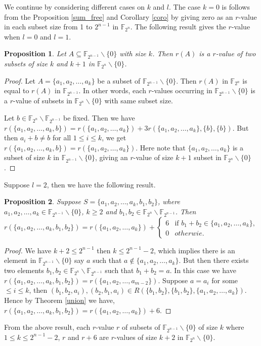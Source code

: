 \documentclass[12pt,a4paper]{article}
\newtheorem{prop}{Proposition}[section]
\begin{document}
	
	\par We continue by considering different cases on $k$ and $l$. The case $k=0$ is follows from the Proposition \ref{sum_free} and Corollary \ref{coro} by giving zero as an $r$-value in each subset size from 1 to $2^{n-1}$ in $\mathbb{F}_{2^n}$. The following result gives the $r$-value when $l=0$ and $l=1$.  
	\begin{prop}\label{l=0,1}
		Let $A\subseteq\mathbb{F}_{2^{n-1}}\backslash\{0\}$ with size $k$. Then $r(A)$ is a $r$-value of two subsets of size $k$ and $k+1$ in $\mathbb{F}_{2^{n}}\backslash\{0\}$.
	\end{prop}
	\begin{proof}
		Let $A=\{a_1,a_2,\dots,a_k\}$ be a subset of $\mathbb{F}_{2^{n-1}}\backslash\{0\}$. Then $r(A)$ in $\mathbb{F}_{2^n}$ is equal to $r(A)$ in $\mathbb{F}_{2^{n-1}}$. In other words, each $r$-values occurring in $\mathbb{F}_{2^{n-1}}\backslash\{0\}$ is a $r$-value of subsets in $\mathbb{F}_{2^n}\backslash\{0\}$ with same subset size.
		
		Let $b\in\mathbb{F}_{2^n}\backslash\mathbb{F}_{2^{n-1}}$ be fixed. Then we have $r(\{a_1,a_2,\dots,a_{k},b\})=r(\{a_1,a_2,\dots,a_{k}\})+3r(\{a_1,a_2,\dots,a_{k}\},\{b\},\{b\})$. But then $a_i+b\neq b$ for all $1\leq i\leq k$, we get $r(\{a_1,a_2,\dots,a_{k},b\})=r(\{a_1,a_2,\dots,a_{k}\})$. Here note that $\{a_1,a_2,\dots,a_{k}\}$ is a subset of size $k$ in $\mathbb{F}_{2^{n-1}}\backslash\{0\}$, giving an $r$-value of size $k+1$ subset in $\mathbb{F}_{2^n}\backslash\{0\}$.
	\end{proof}
	\par Suppose $l=2$, then we have the following result. 
	\begin{prop}\label{l=2}
		Suppose $S=\{a_1,a_2,\dots,a_k,b_1,b_2\}$, where $a_1,a_2,\dots,a_k\in \mathbb{F}_{2^{n-1}}\backslash\{0\}$, $k\geq2$ and $b_1,b_2\in \mathbb{F}_{2^n}\backslash\mathbb{F}_{2^{n-1}}$.  Then $r(\{a_1,a_2,\dots,a_k,b_1,b_2\})=r(\{a_1,a_2,\dots,a_k\})+\begin{cases}
			6 &\text{if }b_1+b_2\in \{a_1,a_2,\dots,a_k\}, \\
			0 & otherwie.
		\end{cases}$
	\end{prop}
	\begin{proof}
		We have $k+2\leq2^{n-1}$ then $k\leq 2^{n-1}-2$, which implies there is an element in $\mathbb{F}_{2^{n-1}}\backslash\{0\}$ say $a$ such that $a\notin\{a_1,a_2,\dots,a_k\}$. But then there exists two elements $b_1,b_2\in \mathbb{F}_{2^n}\backslash\mathbb{F}_{2^{n-1}}$ such that $b_1+b_2=a$. In this case we have $r(\{a_1,a_2,\dots,a_k,b_1,b_2\})=r(\{a_1,a_2,\dots,a_{m-2}\})$. Suppose $a=a_i$ for some $\leq i\leq k$, then $(b_1,b_2,a_i),(b_2,b_1,a_i)\in R(\{b_1,b_2\},\{b_1,b_2\},\{a_1,a_2,\dots,a_k\})$. Hence by Theorem \ref{union} we have, $r(\{a_1,a_2,\dots,a_k,b_1,b_2\})=r(\{a_1,a_2,\dots,a_k\})+6$.
	\end{proof}
	From the above result, each $r$-value $r$ of subsets of $\mathbb{F}_{2^{n-1}}\backslash\{0\}$ of size $k$ where $1\leq k\leq 2^{n-1}-2$, $r$ and $r+6$ are $r$-values of size $k+2$ in $\mathbb{F}_{2^n}\backslash\{0\}$.	
	
\end{document}
